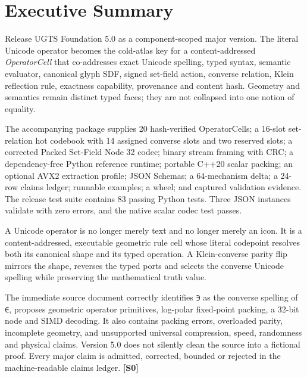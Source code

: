 \documentclass[11pt,a4paper]{article}
\newcommand{\source}[1]{\textcolor{UGTSPurple}{\textbf{[#1]}}}
\begin{document}
\section*{Executive Summary}

\begin{decisionbox}
Release UGTS Foundation 5.0 as a component-scoped major version. The literal Unicode operator becomes the cold-atlas key for a content-addressed \emph{OperatorCell} that co-addresses exact Unicode spelling, typed syntax, semantic evaluator, canonical glyph SDF, signed set-field action, converse relation, Klein reflection rule, exactness capability, provenance and content hash. Geometry and semantics remain distinct typed faces; they are not collapsed into one notion of equality.
\end{decisionbox}

\begin{resultbox}
The accompanying package supplies 20 hash-verified OperatorCells; a 16-slot set-relation hot codebook with 14 assigned converse slots and two reserved slots; a corrected Packed Set-Field Node 32 codec; binary stream framing with CRC; a dependency-free Python reference runtime; portable C++20 scalar packing; an optional AVX2 extraction profile; JSON Schemas; a 64-mechanism delta; a 24-row claims ledger; runnable examples; a wheel; and captured validation evidence. The release test suite contains 83 passing Python tests. Three JSON instances validate with zero errors, and the native scalar codec test passes.
\end{resultbox}

\begin{conclusionbox}
A Unicode operator is no longer merely text and no longer merely an icon. It is a content-addressed, executable geometric rule cell whose literal codepoint resolves both its canonical shape and its typed operation. A Klein-converse parity flip mirrors the shape, reverses the typed ports and selects the converse Unicode spelling while preserving the mathematical truth value.
\end{conclusionbox}

\begin{evidencebox}
The immediate source document correctly identifies \texttt{∋} as the converse spelling of \texttt{∈}, proposes geometric operator primitives, log-polar fixed-point packing, a 32-bit node and SIMD decoding. It also contains packing errors, overloaded parity, incomplete geometry, and unsupported universal compression, speed, randomness and physical claims. Version 5.0 does not silently clean the source into a fictional proof. Every major claim is admitted, corrected, bounded or rejected in the machine-readable claims ledger. \source{S0}
\end{evidencebox}
\end{document}
